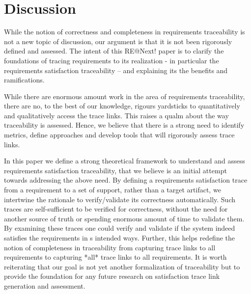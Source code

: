 \section{Discussion}

While the notion of correctness and completeness in requirements traceability is not a new topic of discussion, our argument is that it is not been rigorously defined and assessed. The intent of this RE@Next! paper is to clarify the foundations of tracing requirements to its realization - in particular the requirements satisfaction traceability -- and explaining its the benefits and ramifications.

While there are enormous amount work in the area of requirements traceability, there are no, to the best of our knowledge, rigours yardsticks to quantitatively and qualitatively access the trace links. This raises a qualm about the way traceability is assessed. Hence, we believe that there is a strong need to identify metrics, define approaches and develop tools that will rigorously assess trace links.

In this paper we define a strong theoretical framework to understand and assess requirements satisfaction traceability, that we believe is an initial attempt towards addressing the above need. By defining a requirements satisfaction trace from a requirement to a set of support, rather than a target artifact, we intertwine the rationale to verify/validate its correctness automatically. Such traces are self-sufficient to be verified for correctness, without the need for another source of truth or spending enormous amount of time to validate them. By examining these traces one could verify and validate if the system indeed satisfies the requirements in s intended ways. Further, this helps redefine the notion of completeness in traceability from capturing trace links to all requirements to capturing *all* trace links to all requirements. It is worth reiterating that our goal is not yet another formalization of traceability but to provide the foundation for any future research on satisfaction trace link generation and assessment.

